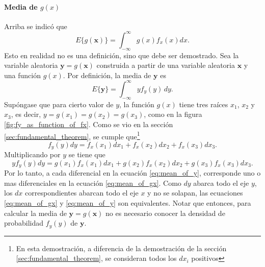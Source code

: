 \documentclass[a4paper]{report}
\newcommand{\x}{\mathbf{x}}
\newcommand{\y}{\mathbf{y}}
\begin{document}
\paragraph{Media de \(g(x)\)} Arriba se indicó que
\begin{equation}\label{eq:mean_of_gx}
 E\{g(\x)\}=\int_{-\infty}^{\infty}g(x)f_x(x)dx.
\end{equation}
Esto en realidad no es una definición, sino que debe ser demostrado. Sea la variable aleatoria \(\y=g(\x)\) construida a partir de una variable aleatoria \(\x\) y una función \(g(x)\). Por definición, la media de \(\y\) es
\begin{equation}\label{eq:mean_of_y}
 E\{\y\}=\int_{-\infty}^{\infty}yf_y(y)\,dy.
\end{equation}
Supóngase que para cierto valor de \(y\), la función \(g(x)\) tiene tres raíces \(x_1\), \(x_2\) y \(x_3\), es decir, \(y=g(x_1)=g(x_2)=g(x_3)\), como en la figura \ref{fig:fy_as_function_of_fx}. Como se vio en la sección \ref{sec:fundamental_theorem}, se cumple que\footnote{En esta demostración, a diferencia de la demostración de la sección \ref{sec:fundamental_theorem}, se consideran todos los \(dx_i\) positivos}
\[
 f_y(y)dy=f_x(x_1)dx_1+f_x(x_2)dx_2+f_x(x_3)dx_3.
\]
Multiplicando por \(y\) se tiene que
\[
 yf_y(y)dy=g(x_1)f_x(x_1)dx_1+g(x_2)f_x(x_2)dx_2+g(x_3)f_x(x_3)dx_3.
\]
Por lo tanto, a cada diferencial en la ecuación \ref{eq:mean_of_y}, corresponde uno o mas diferenciales en la ecuación \ref{eq:mean_of_gx}. Como \(dy\) abarca todo el eje \(y\), los \(dx\) correspondientes abarcan todo el eje \(x\) y no se solapan, las ecuaciones \ref{eq:mean_of_gx} y \ref{eq:mean_of_y} son equivalentes. Notar que entonces, para calcular la media de \(\y=g(\x)\) no es necesario conocer la densidad de probabilidad \(f_y(y)\) de \(\y\).
\end{document}
